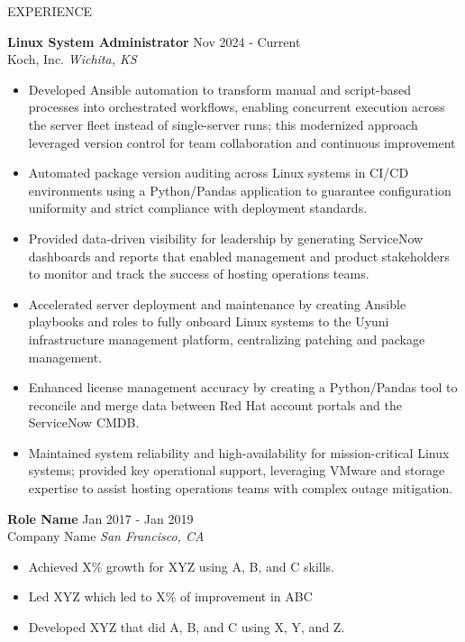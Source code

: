 \documentclass{resume} %
\begin{document}
\begin{rSection}{EXPERIENCE}

\textbf{Linux System Administrator} \hfill Nov 2024 - Current\\
Koch, Inc. \hfill \textit{Wichita, KS}
 \begin{itemize}
    \itemsep -3pt {} 
     \item Developed Ansible automation to transform manual and script-based processes into orchestrated workflows, enabling concurrent execution across the server fleet instead of single-server runs; this modernized approach leveraged version control for team collaboration and continuous improvement
     \item Automated package version auditing across Linux systems in CI/CD environments using a Python/Pandas application to guarantee configuration uniformity and strict compliance with deployment standards.
     \item Provided data-driven visibility for leadership by generating ServiceNow dashboards and reports that enabled management and product stakeholders to monitor and track the success of hosting operations teams.
     \item Accelerated server deployment and maintenance by creating Ansible playbooks and roles to fully onboard Linux systems to the Uyuni infrastructure management platform, centralizing patching and package management.
     \item Enhanced license management accuracy by creating a Python/Pandas tool to reconcile and merge data between Red Hat account portals and the ServiceNow CMDB.
     \item Maintained system reliability and high-availability for mission-critical Linux systems; provided key operational support, leveraging VMware and storage expertise to assist hosting operations teams with complex outage mitigation.
 \end{itemize}
 
\textbf{Role Name} \hfill Jan 2017 - Jan 2019\\
Company Name \hfill \textit{San Francisco, CA}
 \begin{itemize}
    \itemsep -3pt {} 
     \item Achieved X\% growth for XYZ using A, B, and C skills.
     \item Led XYZ which led to X\% of improvement in ABC
    \item Developed XYZ that did A, B, and C using X, Y, and Z. 
 \end{itemize}

\end{rSection} 
\end{document}
